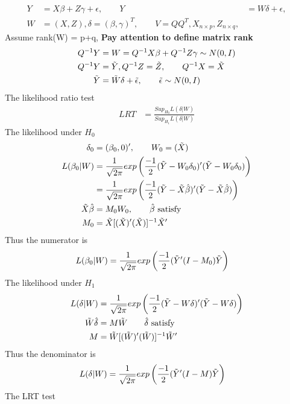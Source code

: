 \documentclass{homework}
\begin{document}
\begin{itemize}
\begin{align*}
Y &= X\beta + Z\gamma + \epsilon, \qquad Y&= W\delta + \epsilon, \\
W &= (X, Z), \delta = (\beta, \gamma)^T, \qquad V = Q Q^{T}, X_{n \times p}, Z_{n \times q}, 
\end{align*}
Assume rank(W) = p+q, \textbf{Pay attention to define matrix rank}
\begin{align*}
Q^{-1}Y &= W = Q^{-1}X \beta + Q^{-1}Z \gamma \sim N(0, I) \\
Q^{-1}Y &= \Tilde{Y}, Q^{-1}Z = \Tilde{Z}, \qquad Q^{-1}X = \Tilde{X}\\
\Tilde{Y} &= \Tilde{W} \delta + \Tilde{\epsilon},  \qquad \Tilde{\epsilon} \sim N(0,I)
\end{align*}
The likelihood ratio test
\begin{align*}
LRT &= \frac{Sup_{H_0} L(\delta| W)}{Sup_{H_1}L(\delta| W)} 
\end{align*}
The likelihood under $H_0$
\begin{align*}
\delta_0 &= (\beta_0, 0)', \qquad W_0 = (\Tilde{X}) \\
L(\beta_0|W) &=\frac{1}{\sqrt{2\pi}} exp \left(\frac{-1}{2} (\Tilde{Y} - W_0\delta_0)'(\Tilde{Y} - W_0\delta_0) \right) \\
&= \frac{1}{\sqrt{2\pi}} exp \left(\frac{-1}{2} (\Tilde{Y} - \Tilde{X}\hat{\beta})'(\Tilde{Y} - \Tilde{X}\hat{\beta}) \right)\\
\Tilde{X}\hat{\beta} &= M_0 W_0, \qquad \hat{\beta} \text{ satisfy}\\
M_0 &= \Tilde{X}[(\Tilde{X})'(\Tilde{X})]^{-1}\Tilde{X}' 
\end{align*}
Thus the numerator is 
\begin{align*}
L(\beta_0|W) &= \frac{1}{\sqrt{2\pi}} exp \left(\frac{-1}{2} (\Tilde{Y}' (I- M_0) \Tilde{Y} \right)
\end{align*}
The likelihood under $H_1$
\begin{align*}
L(\delta|W) &=\frac{1}{\sqrt{2\pi}} exp \left(\frac{-1}{2} (\Tilde{Y} - W\delta)'(\Tilde{Y} - W\delta) \right)\\
\Tilde{W} \hat{\delta} &= M \Tilde{W} \qquad \hat{\delta} \text{ satisfy}\\
M &= \Tilde{W}[(\Tilde{W})'(\Tilde{W})]^{-1}\Tilde{W}' 
\end{align*}
Thus the denominator is 
\begin{align*}
L(\delta|W) &= \frac{1}{\sqrt{2\pi}} exp \left(\frac{-1}{2} (\Tilde{Y}' (I- M) \Tilde{Y} \right)
\end{align*}
The LRT test 
\begin{align*}

\end{align*}
\end{itemize}
\end{document}
